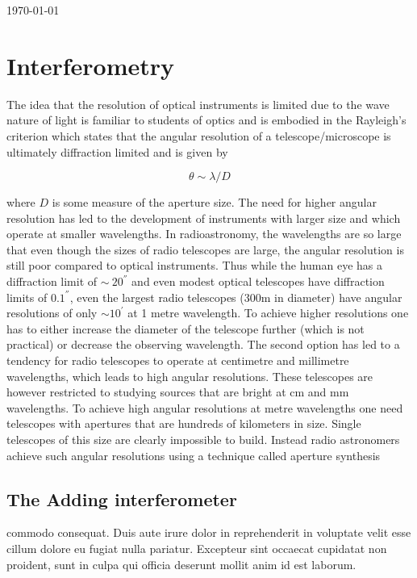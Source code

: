 \documentclass[11pt,letterpaper]{article}
\begin{document}
{\Huge \today}\\[5mm] %

\tableofcontents

\section{Interferometry}

The idea that the resolution of optical instruments is limited due to the wave nature of light is familiar to students of optics and is embodied in the Rayleigh's criterion which states that the angular resolution of a telescope/microscope is ultimately diffraction limited and is given by 

\begin{equation}	
	\theta \sim \lambda/D
\end{equation}

where $D$ is some measure of the aperture size. The need for higher angular resolution has led to the development of instruments with larger size and which operate at smaller wavelengths. In radioastronomy, the wavelengths are so large that even though the sizes of radio telescopes are large, the angular resolution is still poor compared to optical instruments. Thus while the human eye has a diffraction limit of $\sim~20^{''}$ and even modest optical telescopes have diffraction limits of $0.1^{''}$, even the largest radio telescopes (300m in diameter) have angular resolutions of only $\sim 10^{'}$ at 1 metre wavelength. To achieve higher resolutions one has to either increase the diameter of the telescope further (which is not practical) or decrease the observing wavelength. The second option has led to a tendency for radio telescopes to operate at centimetre and millimetre wavelengths, which leads to high angular resolutions. These telescopes are however restricted to studying sources that are bright at cm and mm wavelengths. To achieve high angular resolutions at metre wavelengths one need telescopes with apertures that are hundreds of kilometers in size. Single telescopes of this size are clearly impossible to build. Instead radio astronomers achieve such angular resolutions using a technique called aperture synthesis

\subsection{The Adding interferometer}

commodo consequat. Duis aute irure dolor in reprehenderit in voluptate velit esse cillum dolore eu fugiat nulla pariatur. Excepteur sint occaecat cupidatat non proident, sunt in culpa qui officia deserunt mollit anim id est laborum.
\end{document}
